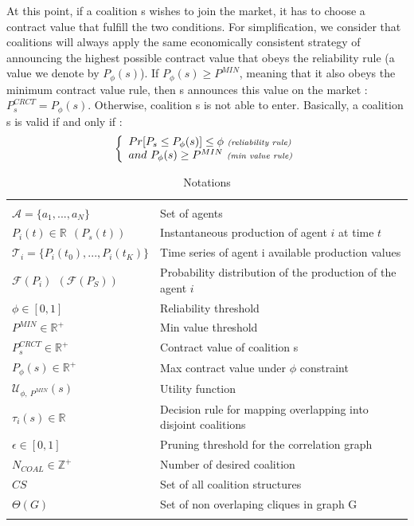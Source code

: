 \documentclass[conference]{IEEEtran}
\begin{document}
At this point, if a coalition s wishes to join the market, it has to choose a contract value that fulfill the two conditions. For simplification, we consider that coalitions will always apply the same economically consistent strategy of announcing the highest possible contract value that obeys the reliability rule (a value we denote by $ P_{\phi}(s) $). If $ P_{\phi}(s) \geq P^{MIN} $, meaning that it also obeys the minimum contract value rule, then s announces this value on the market : $ P_{s}^{CRCT} = P_{\phi}(s) $. Otherwise, coalition s is not able to enter.
Basically, a coalition s is valid if and only if :
\begin{equation}
\left\{ \begin{array}{lll}
		Pr[ P_{s} \leq P_{\phi}(s)] \leq \phi\ \textit{{\scriptsize (reliability rule)}} \\
		and\ P_{\phi}(s) \geq P^{MIN}\ \textit{{\scriptsize (min value rule)}}

\end{array} \right. 
\label{rules}
\end{equation}

\begin{table}[t]
\centering
\scriptsize
\begin{tabular}{l|p{4.5cm}}
  \hline 
  \\
  $ \mathcal{A}=\{a_{1},...,a_{N}\} $ & Set of agents \\
  $ P_{i}(t) \in \mathbb{R}\ \ (P_{s}(t)) $ & Instantaneous production of agent $i$ at time $t$ \\
  $ \mathcal{T}_{i} = \{P_{i}(t_{0}),...,P_{i}(t_{K})\} $ & Time series of agent i available production values \\
  $ \mathcal{F}(P_{i})\ \ (\mathcal{F}(P_{S})) $ & Probability distribution of the production of the agent $i$ \\
  $ \phi \in [0,1] $ & Reliability threshold \\
  $ P^{MIN} \in \mathbb{R}^+ $ & Min value threshold \\
  $ P_{s}^{CRCT} \in \mathbb{R}^+ $ & Contract value of coalition s \\
  $ P_{\phi}(s) \in \mathbb{R}^+ $ & Max contract value under $ \phi $ constraint \\
  $ \mathcal{U}_{\phi,\ P^{MIN}}(s) $ & Utility function \\
  $ \tau_{i}(s) \in \mathbb{R}$ & Decision rule for mapping overlapping into disjoint coalitions \\
  $ \epsilon \in [0,1] $ & Pruning threshold for the correlation graph \\
  $ N_{COAL} \in \mathbb{Z}^+ $ & Number of desired coalition \\
  $ CS $ & Set of all coalition structures \\
  $ \Theta(G) $ & Set of non overlaping cliques in graph G \\
  \\
  \hline
\end{tabular}

\caption{Notations\label{table1}}
\end{table}
\end{document}
